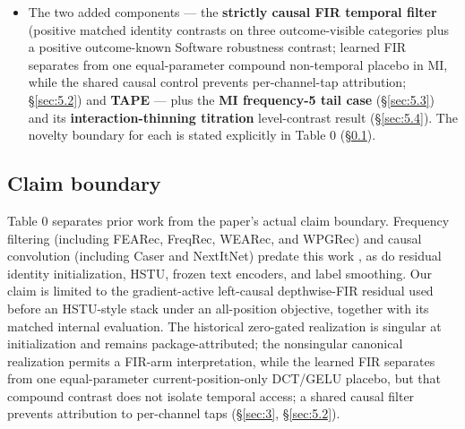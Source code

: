 \begin{itemize}
\item
  The two added components --- the \textbf{strictly causal FIR temporal filter} (positive matched identity contrasts on three outcome-visible categories plus a positive outcome-known Software robustness contrast; learned FIR separates from one equal-parameter compound non-temporal placebo in MI, while the shared causal control prevents per-channel-tap attribution; \S\ref{sec:5.2}) and \textbf{TAPE} --- plus the \textbf{MI frequency-5 tail case} (\S\ref{sec:5.3}) and its \textbf{interaction-thinning titration} level-contrast result (\S\ref{sec:5.4}). The novelty boundary for each is stated explicitly in Table 0 (\S\ref{sec:2.3}).
\end{itemize}


\subsection{Claim boundary}\label{sec:2.3}

Table 0 separates prior work from the paper's actual claim boundary. Frequency
filtering (including FEARec, FreqRec, WEARec, and WPGRec) and causal convolution (including Caser and
NextItNet) predate this work
\citep{du2023fearec,he2026freqrec,xu2026wearec,liu2026wpgrec,tang2018caser,yuan2019nextitnet}, as do residual
identity initialization, HSTU, frozen text encoders, and label smoothing. Our claim is limited to the
gradient-active left-causal depthwise-FIR residual used before an HSTU-style stack under
an all-position objective, together with its matched internal evaluation. The historical
zero-gated realization is singular at initialization and remains package-attributed;
the nonsingular canonical realization permits a FIR-arm interpretation, while the
learned FIR separates from one equal-parameter current-position-only DCT/GELU placebo,
but that compound contrast does not isolate temporal access; a shared causal filter prevents attribution to per-channel taps
(\S\ref{sec:3}, \S\ref{sec:5.2}).



